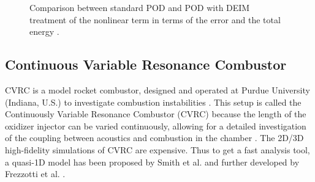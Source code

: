 \begin{figure} [h!]
	\begin{centering}
	\caption{Comparison between standard POD and POD with DEIM treatment of the nonlinear term in terms of the error \protect{} and the total energy \protect{}.}
	\label{p4.fig:RIC2}
	\end{centering}
\end{figure}

\subsection{Continuous Variable Resonance Combustor} \label{p4.sec:5.res.4}

CVRC is a model rocket combustor, designed and operated at Purdue University (Indiana, U.S.) to investigate combustion instabilities \cite{yu2008combustion}. This setup is called the Continuously Variable Resonance Combustor (CVRC) because the length of the oxidizer injector can be varied continuously, allowing for a detailed investigation of the coupling between acoustics and combustion in the chamber \cite{garby2013simulations}. The 2D/3D high-fidelity simulations of CVRC are expensive. Thus to get a fast analysis tool, a quasi-1D model has been proposed by Smith et al. \cite{smith2008computational} and further developed by Frezzotti et al. \cite{frezzotti2015determination,frezzotti2017numerical,frezzotti2018quasi}. 



